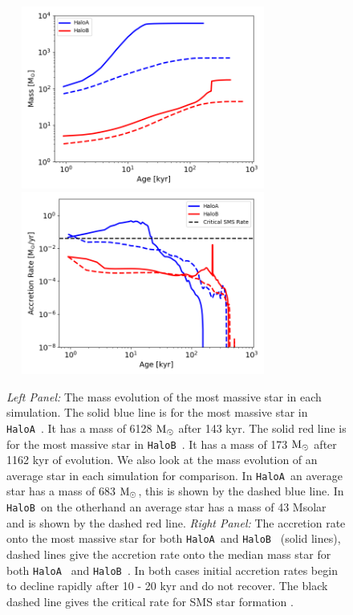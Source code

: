 \documentclass[graphics, twocolumn, usenatbib]{mn2e}
\newcommand{\msolar} {$\rm{M_{\odot}}~$}
\newcommand{\msolarc} {$\rm{M_{\odot}}$}
\newcommand{\ha} {\texttt{HaloA~}}
\newcommand{\hb} {\texttt{HaloB~}}
\begin{document}

\begin{figure}
\centering
\begin{minipage}{175mm}      \begin{center}
    \centerline{
      \includegraphics[width=9.0cm, height=6cm]{FIGURES/Mass_MultipleHaloes.png}
      \includegraphics[width=9.0cm, height=6cm]{FIGURES/MassAccretionRate_MultipleHaloes.png}}
    \caption{
      \textit{Left Panel:} The mass evolution of the most massive star in each simulation. The
      solid blue line is for the most massive star in \ha. It has a mass of 6128 \msolar after 143 kyr.
      The solid red line is for the most massive star in \hb. It has a mass of 173 \msolar after 1162 kyr
      of evolution. We also look at the mass evolution of an average star in each simulation for
      comparison. In \ha an average star has a mass of 683 \msolarc, this is shown by the dashed blue line.
      In \hb on the otherhand an average star has a mass of 43 Msolar and is shown by the dashed red line.
      \textit{Right Panel:} The accretion rate onto the most massive star for both \ha and \hb
      (solid lines), dashed lines give the accretion rate onto the median mass star for both \ha
      and \hb. In both cases initial accretion rates begin to decline rapidly after 10 - 20 kyr and
      do not recover. The black dashed line gives the critical rate for SMS star formation
      \citep{Sakurai_2016}.
    }
\label{Fig:AccretionRates}
\end{center} \end{minipage}
\end{figure}
\end{document}
